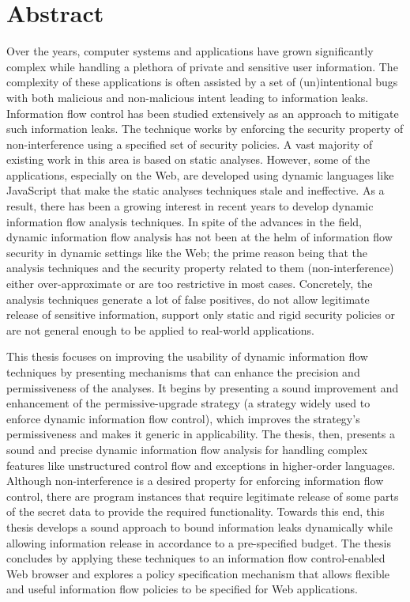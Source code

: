 \section*{Abstract}

{
Over the years, computer systems and applications have grown
significantly complex while handling a plethora of private and
sensitive user information. The complexity of these applications is
often assisted by a set of (un)intentional bugs with both malicious
and non-malicious intent leading to information leaks. Information
flow control has been studied extensively as an approach to mitigate
such information leaks. The technique works by enforcing the security
property of non-interference using a specified set of security
policies. A vast majority of existing work in this area
is based on static analyses. However, some of the applications,
especially on the Web, are developed using dynamic languages like
JavaScript that make the static analyses techniques stale and
ineffective. As a result, there has been a growing interest in recent
years to develop dynamic information flow analysis techniques. In
spite of the advances in the field, dynamic information flow analysis
has not been at the helm of information flow security
in dynamic settings like the Web; the prime
reason being that the analysis techniques and the security property
related to them (non-interference) either over-approximate or are too
restrictive in most cases. Concretely, the analysis techniques
generate a lot of false positives, do not allow legitimate release of
sensitive information, support only static and rigid security
policies or are not general enough to be applied to real-world
applications. 

This thesis focuses on improving the usability of dynamic information
flow techniques by presenting mechanisms that can enhance the
precision and permissiveness of the analyses. It begins by presenting
a sound improvement and enhancement of the permissive-upgrade
strategy (a strategy widely used to enforce dynamic information flow
control), which improves the strategy's permissiveness and makes it
generic in applicability. The thesis, then, presents a sound and
precise dynamic information flow analysis for handling complex
features like unstructured control flow and exceptions in higher-order 
languages. Although non-interference is a desired property for
enforcing information flow control, there are program instances that
require legitimate release of some parts of the secret data to provide
the required functionality. Towards this end, this thesis develops a sound 
approach to bound information leaks dynamically while allowing 
information release in accordance to a pre-specified budget. The thesis
concludes by applying these techniques to an information flow
control-enabled Web browser and explores a policy specification 
mechanism that allows flexible and useful information flow policies to 
be specified for Web applications. 

}
